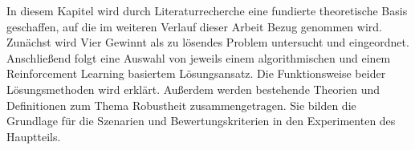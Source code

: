 In diesem Kapitel wird durch Literaturrecherche eine fundierte theoretische Basis geschaffen, auf die im weiteren Verlauf dieser Arbeit Bezug genommen wird. Zunächst wird Vier Gewinnt als zu lösendes Problem untersucht und eingeordnet. Anschließend folgt eine Auswahl von jeweils einem algorithmischen und einem Reinforcement Learning basiertem Lösungsansatz. Die Funktionsweise beider Lösungsmethoden wird erklärt. Außerdem werden bestehende Theorien und Definitionen zum Thema Robustheit zusammengetragen. Sie bilden die Grundlage für die Szenarien und Bewertungskriterien in den Experimenten des Hauptteils.
